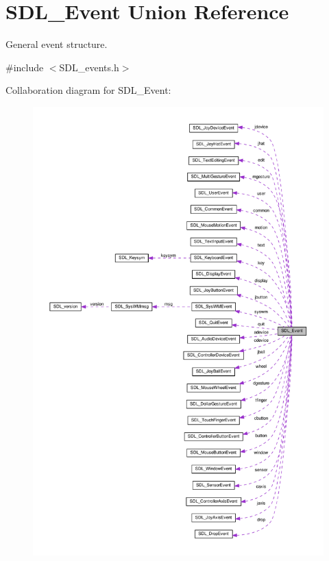 \hypertarget{unionSDL__Event}{}\section{S\+D\+L\+\_\+\+Event Union Reference}
\label{unionSDL__Event}


General event structure.  




{\ttfamily \#include $<$S\+D\+L\+\_\+events.\+h$>$}



Collaboration diagram for S\+D\+L\+\_\+\+Event\+:\nopagebreak
\begin{figure}[H]
\begin{center}
\leavevmode
\includegraphics[width=350pt]{unionSDL__Event__coll__graph}
\end{center}
\end{figure}
